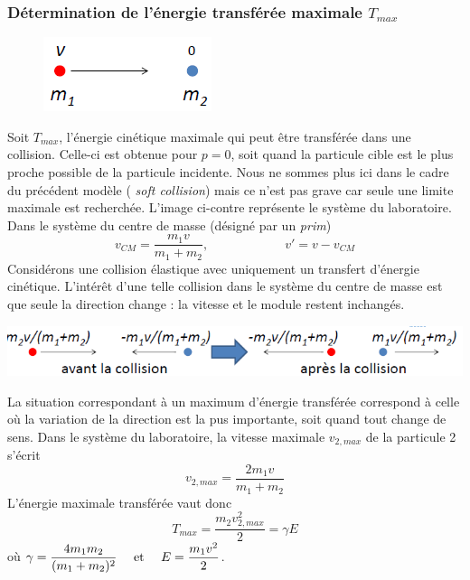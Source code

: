 \subsubsection{Détermination de l'énergie transférée maximale $T_{max}$}
	\begin{figure}
	\vspace{-5mm}
	\includegraphics[scale=0.75]{ch1/image9.png}
	\end{figure}
Soit $T_{max}$, l'énergie cinétique maximale qui peut être transférée dans une collision. 
Celle-ci est obtenue pour $p=0$, soit quand la particule cible est le plus proche possible
de la particule incidente. Nous ne sommes plus ici dans le cadre du précédent modèle (\textit{
soft collision}) mais ce n'est pas grave car seule une limite maximale est recherchée. L'image
ci-contre représente le système du laboratoire.\\

Dans le système du centre de masse (désigné par un \textit{prim})
\begin{equation}
v_{CM}=\frac{m_1v}{m_1+m_2},\qquad\qquad\qquad v'=v-v_{CM}
\end{equation}
Considérons une collision élastique avec uniquement un transfert d'énergie cinétique. L'intérêt
d'une telle collision dans le système du centre de masse est que seule la direction change : 
la vitesse et le module restent inchangés.
\begin{center}
	\includegraphics[scale=0.75]{ch1/image10.png}
\end{center}
La situation correspondant à un maximum d'énergie transférée correspond à celle où la variation 
de la direction est la pus importante, soit quand tout change de sens. Dans le système du 
laboratoire, la vitesse maximale $v_{2,max}$ de la particule 2 s'écrit
\begin{equation}
v_{2,max}=\frac{2m_1v}{m_1+m_2}
\end{equation}
L'énergie maximale transférée vaut donc
\begin{equation}
T_{max}=\frac{m_2v_{2,max}^2}{2}=\gamma E
\end{equation}
où $\displaystyle\gamma=\frac{4m_1m_2}{(m_1+m_2)^2} {\mbox{~~~~et~~~~}}E=\frac{m_1v^2}{2}$.\\

